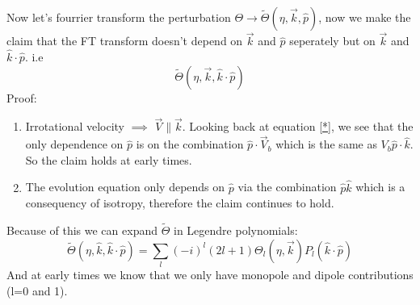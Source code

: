 \documentclass{article}
\begin{document}
Now let's fourrier transform the perturbation $\Theta \rightarrow \tilde{\Theta}(\eta,\vec{k},\hat{p})$, now we make the claim that the FT transform doesn't depend on $\vec{k}$ and $\hat{p}$ seperately but on $\vec{k}$ and $\hat{k}\cdot\hat{p}$. i.e
\begin{equation}
	\tilde{\Theta}(\eta,\vec{k},\hat{k}\cdot\hat{p})
\end{equation}
Proof:
\begin{enumerate}
	\item Irrotational velocity $\implies$ $\vec{V}\parallel\vec{k}$. Looking back at equation \ref{*}, we see that the only dependence on $\hat{p}$ is on the combination $\hat{p}\cdot\vec{V}_b$ which is the same as $V_b \hat{p}\cdot\hat{k}$. So the claim holds at early times.
	\item The evolution equation only depends on $\hat{p}$ via the combination $\hat{p}\hat{k}$ which is a consequency of isotropy, therefore the claim continues to hold.
\end{enumerate}
Because of this we can expand $\tilde{\Theta}$ in Legendre polynomials:
\begin{equation}
	\tilde{\Theta}(\eta,\hat{k},\hat{k}\cdot\hat{p}) = \sum_l (-i)^l (2l + 1)\Theta_l(\eta,\vec{k})P_l(\hat{k}\cdot\hat{p})
\end{equation}
And at early times we know that we only have monopole and dipole contributions (l=0 and 1).
\end{document}
